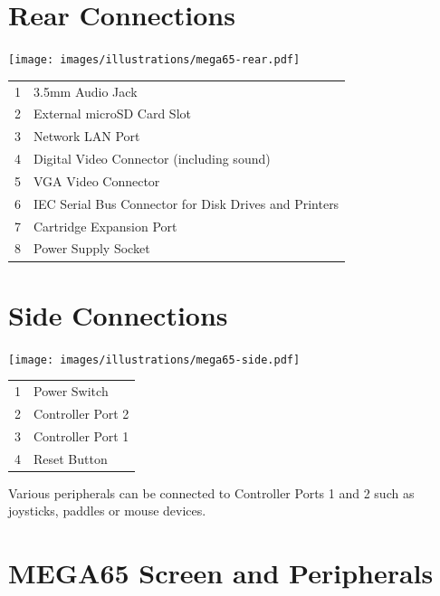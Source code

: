\newpage
\section{Rear Connections}

\texttt{[image: images/illustrations/mega65-rear.pdf]}
\begin{center}
\begin{longtable}{ c | l}
	1	& 	3.5mm Audio Jack \\
	2	& 	External microSD Card Slot\\
	3	& 	Network LAN Port \\
	4	& 	Digital Video Connector (including sound) \\
	5	& 	VGA Video Connector \\
	6	& 	IEC Serial Bus Connector for Disk Drives and Printers \\
	7	& 	Cartridge Expansion Port \\
	8	& 	Power Supply Socket \\
\end{longtable}
\end{center}

\vspace{-1cm}

\section{Side Connections}

\texttt{[image: images/illustrations/mega65-side.pdf]}

\begin{center}
\begin{longtable}{ c | l}
	1	& 	Power Switch \\
	2	& 	Controller Port 2 \\
	3	& 	Controller Port 1 \\
	4	& 	Reset Button \\
\end{longtable}
\end{center}

Various peripherals can be connected to Controller Ports 1 and 2 such as
joysticks, paddles or mouse devices.

\newpage

\section{MEGA65 Screen and Peripherals}

